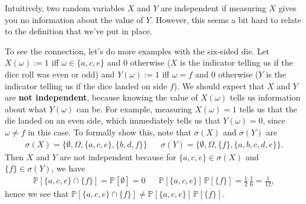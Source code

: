 \begin{example}
	Intuitively, two random variables $X$ and $Y$ are independent if measuring $X$ gives you no information about the value of $Y$. However, this seems a bit hard to relate to the definition that we've put in place. 
	
	To see the connection, let's do more examples with the six-sided die. Let $X(\omega) := 1$ iff $\omega\in \{a, c, e\}$ and 0 otherwise ($X$ is the indicator telling us if the dice roll was even or odd) and $Y(\omega) := 1$ iff $\omega = f$ and 0 otherwise ($Y$ is the indicator telling us if the dice landed on side $f$). We should expect that $X$ and $Y$ are \textbf{not independent}, because knowing the value of $X(\omega)$ tells us information about what $Y(\omega)$ can be. For example, measuring $X(\omega) = 1$ tells us that the die landed on an even side, which immediately tells us that $Y(\omega) = 0$, since $\omega\neq f$ in this case. To formally show this, note that $\sigma(X)$ and $\sigma(Y)$ are
	\begin{align}
		\sigma(X) = \{ \emptyset, \Omega, \{a, c, e\}, \{b, d, f\}\} && \sigma(Y) = \{ \emptyset, \Omega, \{f\}, \{a, b, c, d, e\}\}.
	\end{align}
	Then $X$ and $Y$ are not independent because for $\{a, c, e\}\in\sigma(X)$ and $\{f\}\in\sigma(Y)$, we have
	\begin{align}
		\mathbb P[\{a, c, e\}\cap \{f\}] = \mathbb P[\emptyset] = 0 && \mathbb P[\{a, c, e\}]\,\mathbb P[\{f\}] = \frac{1}{2}\,\frac{1}{6} = \frac{1}{12},
	\end{align}
	hence we see that $\mathbb P[\{a, c, e\}\cap \{f\}] \neq \mathbb P[\{a, c, e\}]\,\mathbb P[\{f\}]$. 
	

\end{example}

